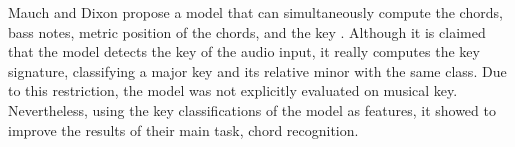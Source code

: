Mauch and Dixon propose a model that can simultaneously
compute the chords, bass notes, metric position of the
chords, and the key \cite{mauch2010simultaneous}. Although
it is claimed that the model detects the key of the audio
input, it really computes the key signature, classifying a
major key and its relative minor with the same class. Due to
this restriction, the model was not explicitly evaluated on
musical key. Nevertheless, using the key classifications of
the model as features, it showed to improve the results of
their main task, chord recognition.














